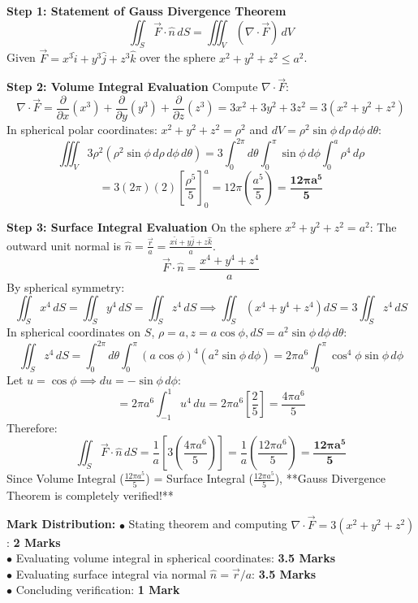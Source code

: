 \begin{solutionbox}
\textbf{Step 1: Statement of Gauss Divergence Theorem}
\[
\iint_S \vec{F} \cdot \hat{n} \, dS = \iiint_V (\nabla \cdot \vec{F}) \, dV
\]
Given $\vec{F} = x^3\hat{i} + y^3\hat{j} + z^3\hat{k}$ over the sphere $x^2 + y^2 + z^2 \le a^2$.

\textbf{Step 2: Volume Integral Evaluation}
Compute $\nabla \cdot \vec{F}$:
\[
\nabla \cdot \vec{F} = \frac{\partial}{\partial x}(x^3) + \frac{\partial}{\partial y}(y^3) + \frac{\partial}{\partial z}(z^3) = 3x^2 + 3y^2 + 3z^2 = 3(x^2 + y^2 + z^2)
\]
In spherical polar coordinates: $x^2 + y^2 + z^2 = \rho^2$ and $dV = \rho^2 \sin\phi \, d\rho \, d\phi \, d\theta$:
\[
\iiint_V 3\rho^2 (\rho^2 \sin\phi \, d\rho \, d\phi \, d\theta) = 3 \int_0^{2\pi} d\theta \int_0^\pi \sin\phi \, d\phi \int_0^a \rho^4 \, d\rho
\]
\[
= 3 (2\pi)(2) \left[ \frac{\rho^5}{5} \right]_0^a = 12\pi \left(\frac{a^5}{5}\right) = \mathbf{\frac{12\pi a^5}{5}}
\]

\textbf{Step 3: Surface Integral Evaluation}
On the sphere $x^2 + y^2 + z^2 = a^2$:
The outward unit normal is $\hat{n} = \frac{\vec{r}}{a} = \frac{x\hat{i} + y\hat{j} + z\hat{k}}{a}$.
\[
\vec{F} \cdot \hat{n} = \frac{x^4 + y^4 + z^4}{a}
\]
By spherical symmetry:
\[
\iint_S x^4 \, dS = \iint_S y^4 \, dS = \iint_S z^4 \, dS \implies \iint_S (x^4 + y^4 + z^4) dS = 3 \iint_S z^4 \, dS
\]
In spherical coordinates on $S$, $\rho = a, z = a\cos\phi, dS = a^2 \sin\phi \, d\phi \, d\theta$:
\[
\iint_S z^4 \, dS = \int_0^{2\pi} d\theta \int_0^\pi (a\cos\phi)^4 (a^2 \sin\phi \, d\phi) = 2\pi a^6 \int_0^\pi \cos^4\phi \sin\phi \, d\phi
\]
Let $u = \cos\phi \implies du = -\sin\phi \, d\phi$:
\[
= 2\pi a^6 \int_{-1}^1 u^4 \, du = 2\pi a^6 \left[ \frac{2}{5} \right] = \frac{4\pi a^6}{5}
\]
Therefore:
\[
\iint_S \vec{F} \cdot \hat{n} \, dS = \frac{1}{a} \left[ 3 \left(\frac{4\pi a^6}{5}\right) \right] = \frac{1}{a} \left(\frac{12\pi a^6}{5}\right) = \mathbf{\frac{12\pi a^5}{5}}
\]
Since Volume Integral ($\frac{12\pi a^5}{5}$) = Surface Integral ($\frac{12\pi a^5}{5}$), **Gauss Divergence Theorem is completely verified!**

\begin{markingrubric}
\textbf{Mark Distribution:}
$\bullet$ Stating theorem and computing $\nabla \cdot \vec{F} = 3(x^2+y^2+z^2)$: \textbf{2 Marks}\\
$\bullet$ Evaluating volume integral in spherical coordinates: \textbf{3.5 Marks}\\
$\bullet$ Evaluating surface integral via normal $\hat{n} = \vec{r}/a$: \textbf{3.5 Marks}\\
$\bullet$ Concluding verification: \textbf{1 Mark}
\end{markingrubric}
\end{solutionbox}

\newpage
